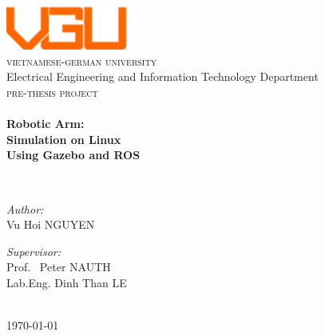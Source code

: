 \begin{titlepage}
\begin{center}

\includegraphics[width=0.3\textwidth]{./image/vgu_logo}~\\[1cm]
\textsc{\LARGE vietnamese-german university}~\\[0.2cm]
Electrical Engineering and Information Technology Department ~\\[3cm]
\textsc{\Large pre-thesis project}\\[0.5cm]

\HRule \\[0.4cm]
{ \huge \bfseries Robotic Arm:\\ Simulation on Linux \\ Using Gazebo and ROS \\[0.5cm] }

\HRule \\[3cm]

\noindent
\begin{minipage}[t]{0.4\textwidth}
\begin{flushleft} \large
\emph{Author:}\\
Vu Hoi \textsc{NGUYEN}
\end{flushleft}
\end{minipage}%
\begin{minipage}[t]{0.4\textwidth}
\begin{flushright} \large
\emph{Supervisor:} \\
Prof. ~Peter \textsc{NAUTH} \\
Lab.Eng. Dinh Than \textsc{LE}
\end{flushright}
\end{minipage}
\vfill

~\\[1cm]
{\large \today}

\end{center}


\end{titlepage}
